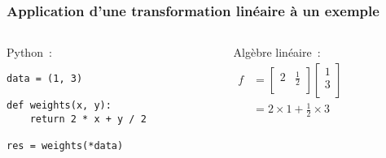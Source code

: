 \documentclass{formation}
\begin{document}
\begin{frame}[fragile]
  \frametitle{Application d'une transformation linéaire à un exemple}
  \begin{columns}
    \begin{column}{0.5\textwidth}
      Python :
\begin{verbatim}
data = (1, 3)

def weights(x, y):
    return 2 * x + y / 2

res = weights(*data)
\end{verbatim}
    \end{column}
    \begin{column}{0.5\textwidth}
      Algèbre linéaire : \\[.3cm]

      \(
      \begin{aligned}
        f & = \begin{bmatrix}
          2 & \frac{1}{2} \\
        \end{bmatrix}
        \begin{bmatrix}
          1 \\
          3 \\
        \end{bmatrix} \\
        & = 2 \times 1 + \frac{1}{2} \times 3
      \end{aligned}
      \)
    \end{column}
  \end{columns}
\end{frame}
\end{document}

